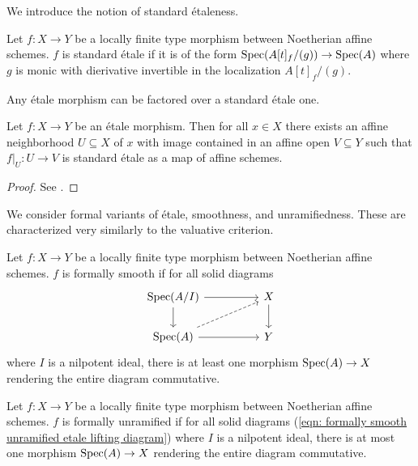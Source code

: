 We introduce the notion of standard \'{e}taleness. 
\begin{definition}\label{def: standard etale}
    Let $f:X\to Y$ be a locally finite type morphism between Noetherian affine schemes. $f$ is standard \'{e}tale if it is of the form $\operatorname{Spec}(A[t]_{f}/(g))\to\operatorname{Spec}(A)$ where $g$ is monic with dierivative invertible in the localization $A[t]_{f}/(g)$. 
\end{definition}
Any \'{e}tale morphism can be factored over a standard \'{e}tale one. 
\begin{proposition}\label{prop: etale factors as standard etale}
    Let $f:X\to Y$ be an \'{e}tale morphism. Then for all $x\in X$ there exists an affine neighborhood $U\subseteq X$ of $x$ with image contained in an affine open $V\subseteq Y$ such that $f|_{U}:U\to V$ is standard \'{e}tale as a map of affine schemes. 
\end{proposition}
\begin{proof}
    See \cite[\href{https://stacks.math.columbia.edu/tag/02GT}{Tag 02GT}]{stacks-project}.
\end{proof}
We consider formal variants of \'{e}tale, smoothness, and unramifiedness. These are characterized very similarly to the valuative criterion. 
\begin{definition}\label{def: formally smooth}
    Let $f:X\to Y$ be a locally finite type morphism between Noetherian affine schemes. $f$ is formally smooth if for all solid diagrams 
    \begin{equation}\label{eqn: formally smooth unramified etale lifting diagram}
    \begin{tikzcd}
        {\spec(A/I)} && X \\
        {\spec(A)} && Y
        \arrow[from=1-1, to=1-3]
        \arrow[from=1-1, to=2-1]
        \arrow[from=1-3, to=2-3]
        \arrow[dashed, from=2-1, to=1-3]
        \arrow[from=2-1, to=2-3]
    \end{tikzcd}
    \end{equation}
    where $I$ is a nilpotent ideal, there is at least one morphism $\operatorname{Spec}(A)\to X$ rendering the entire diagram commutative. 
\end{definition}
\begin{definition}\label{def: formally unramified}
    Let $f:X\to Y$ be a locally finite type morphism between Noetherian affine schemes. $f$ is formally unramified if for all solid diagrams (\ref{eqn: formally smooth unramified etale lifting diagram}) where $I$ is a nilpotent ideal, there is at most one morphism $\operatorname{Spec}(A)\to X$ rendering the entire diagram commutative. 
\end{definition}
